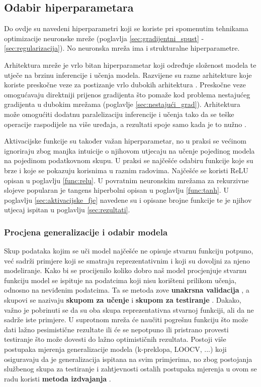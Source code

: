 \documentclass[times, utf8, numeric, diplomski]{fer}
\def\secref#1{(poglavlje \ref{#1})}
\begin{document}
\subsection{Odabir hiperparametara}
Do ovdje su navedeni hiperparametri koji se koriste pri spomenutim tehnikama optimizacije neuronske mreže (poglavlja \ref{sec:gradijentni_spust} - \ref{sec:regularizacija}). No neuronska mreža ima i strukturalne hiperparametre.

Arhitektura mreže je vrlo bitan hiperparametar koji određuje složenost modela te utječe na brzinu inferencije i učenja modela. Razvijene su razne arhitekture koje koriste preskočne veze za postizanje vrlo dubokih arhitektura \citep{resnet, densenet}. Preskočne veze omogućavaju direktniji prijenos gradijenta što pomaže kod problema nestajućeg gradijenta u dubokim mrežama \secref{sec:nestajući_grad}. Arhitektura može omogućiti dodatnu paralelizaciju inferencije i učenja tako da se teške operacije raspodijele na više uređaja, a rezultati spoje samo kada je to nužno \citep{alexnet}.

Aktivacijske funkcije su također važan hiperparametar, no u praksi se većinom ignoriraju zbog manjka intuicije o njihovom utjecaju na učenje pojedinog modela na pojedinom podatkovnom skupu. U praksi se najčešće odabiru funkcije koje su brze i koje se pokazuju korisnima u raznim radovima. Najčešće se koristi ReLU opisan u poglavlju \ref{func:relu}. U povratnim neuronskim mrežama za rekurzivne slojeve popularan je tangens hiperbolni opisan u poglavlju \ref{func:tanh}. U poglavlju \ref{sec:aktivacijske_fje} navedene su i opisane brojne funkcije te je njihov utjecaj ispitan u poglavlju \ref{sec:rezultati}.

\subsubsection{Procjena generalizacije i odabir modela}
\label{sec:crossval}
Skup podataka kojim se uči model najčešće ne opisuje stvarnu funkciju potpuno, već sadrži primjere koji se smatraju reprezentativnim i koji su dovoljni za njeno modeliranje. Kako bi se procijenilo koliko dobro naš model procjenjuje stvarnu funkciju model se ispituje na podatcima koji nisu korišteni prilikom učenja, odnosno na neviđenim podatcima. Ta se metoda zove \textbf{unakrsna validacija} , a skupovi se nazivaju \textbf{skupom za učenje}  i \textbf{skupom za testiranje} . Dakako, važno je pobrinuti se da su oba skupa reprezentativna stvarnoj funkciji, ali da ne sadrže iste primjere. U suprotnom mreža će naučiti pogrešnu funkciju što može dati lažno pesimistične rezultate ili će se nepotpuno ili pristrano provesti testiranje što može dovesti do lažno optimističnih rezultata. Postoji više postupaka mjerenja generalizacije modela (k-preklopa, LOOCV, ...) koji osiguravaju da je generalizacija ispitana na svim primjerima, no zbog postojanja službenog skupa za testiranje i zahtjevnosti ostalih postupaka mjerenja u ovom se radu koristi \textbf{metoda izdvajanja} .
\end{document}
